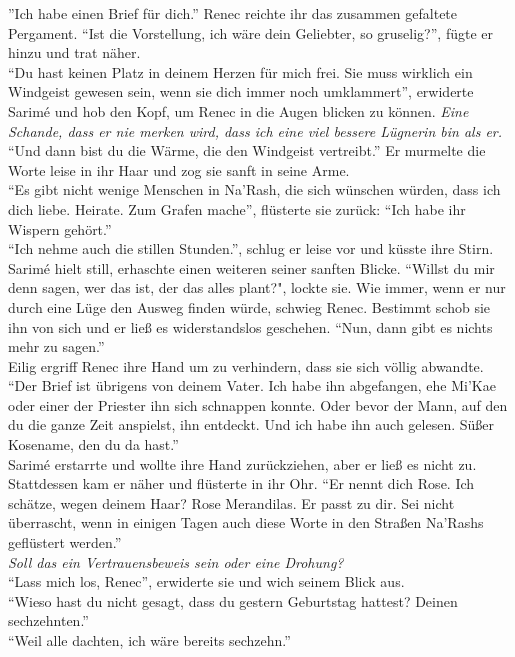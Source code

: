 ''Ich habe einen Brief für dich.'' Renec reichte ihr das zusammen gefaltete Pergament. ``Ist die 
Vorstellung, ich wäre dein Geliebter, so gruselig?'', fügte er hinzu und trat näher.\\
``Du hast keinen Platz in deinem Herzen für mich frei. Sie muss wirklich ein Windgeist gewesen 
sein, wenn sie dich immer noch umklammert'', erwiderte Sarimé und hob den Kopf, um Renec in die 
Augen blicken zu können. \textit{Eine Schande, dass er nie merken wird, dass ich eine viel 
bessere Lügnerin bin als er.}\\
``Und dann bist du die Wärme, die den Windgeist vertreibt.'' Er murmelte die Worte leise in ihr 
Haar und zog sie sanft in seine Arme.\\
``Es gibt nicht wenige Menschen in Na'Rash, die sich wünschen würden, dass ich dich liebe. Heirate. 
Zum Grafen mache'', flüsterte sie zurück: ``Ich habe ihr Wispern gehört.''\\
``Ich nehme auch die stillen Stunden.'', schlug er leise vor und küsste ihre Stirn.\\
Sarimé hielt still, erhaschte einen weiteren seiner sanften Blicke. ``Willst du mir denn sagen, 
wer das ist, der das alles plant?", lockte sie.
Wie immer, wenn er nur durch eine Lüge den Ausweg finden würde, schwieg Renec. Bestimmt schob sie 
ihn von sich und er ließ es widerstandslos geschehen. ``Nun, dann gibt es nichts mehr zu sagen.''\\
Eilig ergriff Renec ihre Hand um zu verhindern, dass sie sich völlig abwandte. ``Der Brief ist 
übrigens von deinem Vater. Ich habe ihn abgefangen, ehe Mi'Kae oder einer der Priester ihn sich 
schnappen konnte. Oder bevor der Mann, auf den du die ganze Zeit anspielst, ihn entdeckt. Und ich 
habe ihn auch gelesen. Süßer Kosename, den du da hast.''\\
Sarimé erstarrte und wollte ihre Hand zurückziehen, aber er ließ es nicht zu. Stattdessen kam er 
näher und flüsterte in ihr Ohr. ``Er nennt dich Rose. Ich schätze, wegen deinem Haar? Rose 
Merandilas. Er passt zu dir. Sei nicht überrascht, wenn in einigen Tagen auch diese Worte in den 
Straßen Na'Rashs geflüstert werden.''\\
\textit{Soll das ein Vertrauensbeweis sein oder eine Drohung?}\\
``Lass mich los, Renec'', erwiderte sie und wich seinem Blick aus.\\
``Wieso hast du nicht gesagt, dass du gestern Geburtstag hattest? Deinen sechzehnten.''\\
``Weil alle dachten, ich wäre bereits sechzehn.''\\
